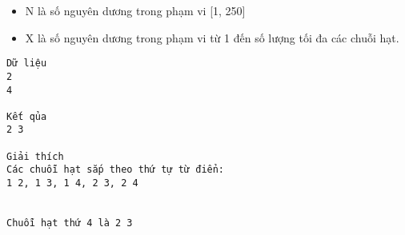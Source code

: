 \begin{itemize}
	\item     N là số nguyên dương trong phạm vi [1, 250]   
	\item     X là số nguyên dương trong phạm vi từ 1 đến số lượng tối đa các chuỗi hạt.   
\end{itemize}
\begin{verbatim}
Dữ liệu
2
4

Kết qủa
2 3

Giải thích
Các chuỗi hạt sắp theo thứ tự từ điển:
1 2, 1 3, 1 4, 2 3, 2 4


Chuỗi hạt thứ 4 là 2 3

\end{verbatim}